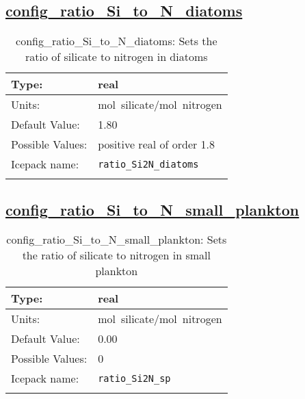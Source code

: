 \subsection[config\_ratio\_Si\_to\_N\_diatoms]{\hyperref[sec:nm_tab_biogeochemistry]{config\_ratio\_Si\_to\_N\_diatoms}}
\label{subsec:nm_sec_config_ratio_Si_to_N_diatoms}
\begin{center}
\begin{longtable}{| p{2.0in} || p{4.0in} |}
    \hline
    Type: & real \\
    \hline
    Units: & \si{mol.silicate/mol.nitrogen} \\
    \hline
    Default Value: & 1.80 \\
    \hline
    Possible Values: & positive real of order 1.8 \\
    \hline
    Icepack name: & \verb+ratio_Si2N_diatoms+ \\
    \hline
    \caption{config\_ratio\_Si\_to\_N\_diatoms: Sets the ratio of silicate to nitrogen in diatoms}
\end{longtable}
\end{center}
\subsection[config\_ratio\_Si\_to\_N\_small\_plankton]{\hyperref[sec:nm_tab_biogeochemistry]{config\_ratio\_Si\_to\_N\_small\_plankton}}
\label{subsec:nm_sec_config_ratio_Si_to_N_small_plankton}
\begin{center}
\begin{longtable}{| p{2.0in} || p{4.0in} |}
    \hline
    Type: & real \\
    \hline
    Units: & \si{mol.silicate/mol.nitrogen} \\
    \hline
    Default Value: & 0.00 \\
    \hline
    Possible Values: & 0 \\
    \hline
    Icepack name: & \verb+ratio_Si2N_sp+ \\
    \hline
    \caption{config\_ratio\_Si\_to\_N\_small\_plankton: Sets the ratio of silicate to nitrogen in small plankton}
\end{longtable}
\end{center}
